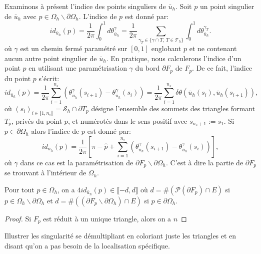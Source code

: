 Examinons à présent l'indice des points singuliers de $\bar{u}_h$. Soit $p$ un point singulier de $\bar{u}_h$ avec $p\in\Omega_h\backslash\partial\Omega_h$. L'indice de $p$ est donné par:
$$
id_{\bar{u}_h}(p)=\frac{1}{2\pi}\int_0^1 d\theta^\gamma_{\bar{u}_h}=\frac{1}{2\pi}\sum_{\gamma_T\in\{\gamma\cap T,~T\in\mathcal{T}_h\}}\int_0^1 d\theta^{\gamma_T}_{\bar{u}_h}.
$$
où $\gamma$ est un chemin fermé paramétré sur $[0, 1]$ englobant $p$ et ne contenant aucun autre point singulier de $\bar{u}_h$. En pratique, nous calculerons l'indice d'un point $p$ en utilisant une paramétrisation $\gamma$ du bord $\partial F_p$ de $F_p$. De ce fait, l'indice du point $p$ s'écrit:
\begin{equation}
    \label{eqn:ind_int}
    id_{\bar{u}_h}(p)=\displaystyle\frac{1}{2\pi}\displaystyle\sum_{i=1}^{n_s}\left(\theta^\gamma_{\bar{u}_h}(s_{i+1})-\theta^\gamma_{\bar{u}_h}(s_i)\right)=\displaystyle\frac{1}{2\pi}\sum_{i=1}^{n_s}\delta\theta(\bar{u}_h(s_i),\bar{u}_h(s_{i+1})),
\end{equation}
où $(s_i)_{i\in\llbracket 1, n_s\rrbracket}=\mathcal{S}_h\cap\partial T_p$ désigne l'ensemble des sommets des triangles formant $T_p$, privés du point $p$, et numérotés dans le sens positif avec $s_{n_s+1}:=s_1$.
Si $p\in\partial\Omega_h$ alors l'indice de $p$ est donné par:
\begin{equation}
    \label{eqn:ind_bord}
    id_{\bar{u}_h}(p)=\displaystyle\frac{1}{2\pi}\left[\pi-\widehat{p}+\displaystyle\sum_{i=1}^{n_s}\left(\theta^\gamma_{\bar{u}_h}(s_{i+1})-\theta^\gamma_{\bar{u}_h}(s_i)\right)\right],
\end{equation}
où $\gamma$ dans ce cas est la paramétrisation de $\partial F_p\backslash\partial\Omega_h$. C'est à dire la partie de $\partial F_p$ se trouvant à l'intérieur de $\Omega_h$.

\begin{proposition}
    Pour tout $p\in\Omega_h$, on a $4id_{\bar{u}_h}(p)\in\llbracket -d, d\rrbracket$ où $d=\#(\mathcal{P}(\partial F_p)\cap E)$ si $p\in\Omega_h\backslash\partial\Omega_h$ et $d=\#((\partial F_p\backslash\partial\Omega_h)\cap E)$ si $p\in\partial\Omega_h$.
\end{proposition}

\begin{proof}
    Si $F_p$ est réduit à un unique triangle, alors on a $n$
\end{proof}


Illustrer les singularité se démultipliant  en coloriant juste les triangles et en disant qu'on a pas besoin de la localisation spécifique.\\

